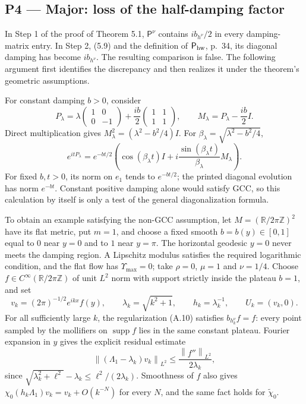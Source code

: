 \documentclass[10pt]{article}
\begin{document}
\subsection*{P4 — Major: loss of the half-damping factor}
In Step 1 of the proof of Theorem 5.1, \(\mathsf P^\nu\) contains \(ib_{h^\nu}/2\) in every damping-matrix entry. In Step 2, (5.9) and the definition of \(\mathsf P_{\rm hw}\), p. 34, its diagonal damping has become \(ib_{h^\nu}\). The resulting comparison is false. The following argument first identifies the discrepancy and then realizes it under the theorem’s geometric assumptions.\par
For constant damping \(b>0\), consider \[P_\lambda=\lambda\begin{pmatrix}1&0\\0&-1\end{pmatrix}
              +\frac{ib}{2}\begin{pmatrix}1&1\\1&1\end{pmatrix},
 \qquad M_\lambda=P_\lambda-\frac{ib}{2}I .\] Direct multiplication gives \(M_\lambda^2=(\lambda^2-b^2/4)I\). For \(\beta_\lambda=\sqrt{\lambda^2-b^2/4}\), \[e^{itP_\lambda}
 =e^{-bt/2}\left(\cos(\beta_\lambda t)I+
              i\frac{\sin(\beta_\lambda t)}{\beta_\lambda}M_\lambda\right).\] For fixed \(b,t>0\), its norm on \(e_1\) tends to \(e^{-bt/2}\); the printed diagonal evolution has norm \(e^{-bt}\). Constant positive damping alone would satisfy GCC, so this calculation by itself is only a test of the general diagonalization formula.\par
To obtain an example satisfying the non-GCC assumption, let \(M=(\mathbb R/2\pi\mathbb Z)^2\) have its flat metric, put \(m=1\), and choose a fixed smooth \(b=b(y)\in[0,1]\) equal to \(0\) near \(y=0\) and to \(1\) near \(y=\pi\). The horizontal geodesic \(y=0\) never meets the damping region. A Lipschitz modulus satisfies the required logarithmic condition, and the flat flow has \(\Upsilon_{\max}=0\); take \(\rho=0\), \(\mu=1\) and \(\nu=1/4\). Choose \(f\in C^\infty(\mathbb R/2\pi\mathbb Z)\) of unit \(L^2\) norm with support strictly inside the plateau \(b=1\), and set \[v_k=(2\pi)^{-1/2}e^{ikx}f(y),\qquad
 \lambda_k=\sqrt{k^2+1},\qquad h_k=\lambda_k^{-1},\qquad U_k=(v_k,0).\] For all sufficiently large \(k\), the regularization (A.10) satisfies \(b_{h_k^\nu}f=f\): every point sampled by the mollifiers on \(\operatorname{supp}f\) lies in the same constant plateau. Fourier expansion in \(y\) gives the explicit residual estimate \[\left\|(\Lambda_1-\lambda_k)v_k\right\|_{L^2}
 \leq\frac{\left\|f''\right\|_{L^2}}{2\lambda_k},\] since \(\sqrt{\lambda_k^2+\ell^2}-\lambda_k\leq\ell^2/(2\lambda_k)\). Smoothness of \(f\) also gives \(\chi_0(h_k\Lambda_1)v_k=v_k+O(k^{-N})\) for every \(N\), and the same fact holds for \(\widetilde\chi_0\).\par
\end{document}
